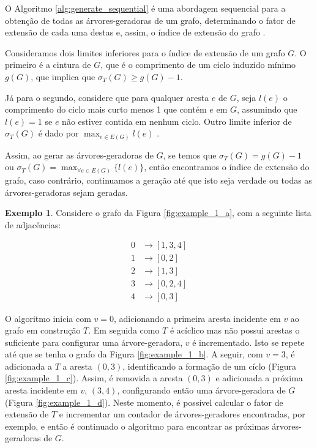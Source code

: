 \documentclass[article,a4paper,12pt,brazil,sumario=tradicional]{abntex2}
\theoremstyle{definition} %
\newtheorem{example}{Exemplo}
\begin{document}
O Algoritmo \ref{alg:generate_sequential} é uma abordagem sequencial para a obtenção de todas as árvores-geradoras de um grafo, determinando o fator de extensão de cada uma destas e, assim, o índice de extensão do grafo \cite{COUTO2022106265}.

Consideramos dois limites inferiores para o índice de extensão de um grafo $G$. O primeiro é a cintura de $G$, que é o comprimento de um ciclo induzido mínimo $g(G)$, que implica que $\sigma_T(G) \geq g(G) - 1$.

Já para o segundo, considere que para qualquer aresta $e$ de $G$, seja $l(e)$ o comprimento do ciclo mais curto menos 1 que contém $e$ em $G$, assumindo que $l(e) = 1$ se $e$ não estiver contida em nenhum ciclo. Outro limite inferior de $\sigma_T(G)$ é dado por $\max_{e \in E(G)} l(e)$ \cite{COUTO2022106265}.

Assim, ao gerar as árvores-geradoras de $G$, se temos que $\sigma_T(G) = g(G) - 1$ ou $\sigma_T(G) = \max_{\forall e \in E(G)} \{ l(e) \}$, então encontramos o índice de extensão do grafo, caso contrário, continuamos a geração até que isto seja verdade ou todas as árvores-geradoras sejam geradas.





\newpage

\begin{example}

Considere o grafo da Figura \ref{fig:example_1_a}, com a seguinte lista de adjacências:

\begin{equation*}
\begin{aligned}
0 &\rightarrow [1, 3, 4] \\
1 &\rightarrow [0, 2] \\
2 &\rightarrow [1, 3] \\
3 &\rightarrow [0, 2, 4] \\
4 &\rightarrow [0, 3]
\end{aligned}
\end{equation*}

O algoritmo inicia com $v = 0$, adicionando a primeira aresta incidente em $v$ ao grafo em construção $T$. Em seguida como $T$ é acíclico mas não possui arestas o suficiente para configurar uma árvore-geradora, $v$ é incrementado. Isto se repete até que se tenha o grafo da Figura \ref{fig:example_1_b}. A seguir, com $v = 3$, é adicionada a $T$ a aresta $(0,3)$, identificando a formação de um cíclo (Figura \ref{fig:example_1_c}). Assim, é removida a aresta $(0,3)$ e adicionada a próxima aresta incidente em $v$, $(3,4)$, configurando então uma árvore-geradora de $G$ (Figura \ref{fig:example_1_d}). Neste momento, é possível calcular o fator de extensão de $T$ e incrementar um contador de árvores-geradores encontradas, por exemplo, e então é continuado o algoritmo para encontrar as próximas árvores-geradoras de $G$.

\end{example}
\end{document}

